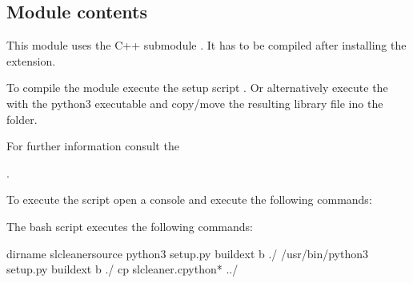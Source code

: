 \documentclass[a4paper,10pt,english]{sphinxmanual}
\begin{document}
\subsection{Module contents}
\label{\detokenize{drc:module-kppc.drc}}\label{\detokenize{drc:module-contents}}
This module uses the C++ submodule {\hyperref[\detokenize{drc:slcleaner}]{}}. It has to be compiled after installing the
extension.

To compile the module execute the setup script .
Or alternatively execute the  with the python3 executable
and copy/move the resulting  library file ino the  folder.

For further information consult the %
\begin{footnote}[4]\sphinxAtStartFootnote
{}
%
\end{footnote}.

To execute the script open a console and execute the following commands:

%
\begin{sphinxVerbatim}[commandchars=\\\{\}]
\end{sphinxVerbatim}

The bash script executes the following commands:

%
\begin{sphinxVerbatim}[commandchars=\\\{\}]

 dirname 
 slcleaner\PYGZus{}source
python3 setup.py build\PYGZus{}ext \PYGZhy{}b ./
/usr/bin/python3 setup.py build\PYGZus{}ext \PYGZhy{}b ./
cp slcleaner.cpython* ../
\end{sphinxVerbatim}
\end{document}
